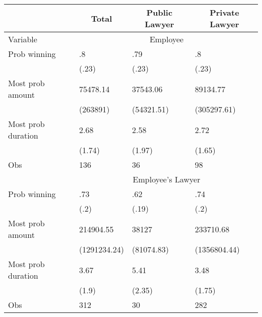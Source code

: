 \begin{tabular}{rrrr}
\toprule
      & \multicolumn{1}{c}{Total} & \multicolumn{1}{c}{Public Lawyer} & \multicolumn{1}{c}{Private Lawyer} \\
\midrule
\multicolumn{1}{l}{Variable} & \multicolumn{3}{c}{Employee} \\
\midrule
\midrule
\multicolumn{1}{l}{Prob winning} & \multicolumn{1}{l}{.8} & \multicolumn{1}{l}{.79} & \multicolumn{1}{l}{.8} \\
\multicolumn{1}{l}{} & \multicolumn{1}{l}{(.23)} & \multicolumn{1}{l}{(.23)} & \multicolumn{1}{l}{(.23)} \\
\multicolumn{1}{l}{Most prob amount} & \multicolumn{1}{l}{75478.14} & \multicolumn{1}{l}{37543.06} & \multicolumn{1}{l}{89134.77} \\
\multicolumn{1}{l}{} & \multicolumn{1}{l}{(263891)} & \multicolumn{1}{l}{(54321.51)} & \multicolumn{1}{l}{(305297.61)} \\
\multicolumn{1}{l}{Most prob duration} & \multicolumn{1}{l}{2.68} & \multicolumn{1}{l}{2.58} & \multicolumn{1}{l}{2.72} \\
\multicolumn{1}{l}{} & \multicolumn{1}{l}{(1.74)} & \multicolumn{1}{l}{(1.97)} & \multicolumn{1}{l}{(1.65)} \\
\multicolumn{1}{l}{Obs} & \multicolumn{1}{l}{136} & \multicolumn{1}{l}{36} & \multicolumn{1}{l}{98} \\
\midrule
\multicolumn{1}{l}{} & \multicolumn{3}{c}{Employee's Lawyer} \\
\midrule
\midrule
\multicolumn{1}{l}{Prob winning} & \multicolumn{1}{l}{.73} & \multicolumn{1}{l}{.62} & \multicolumn{1}{l}{.74} \\
\multicolumn{1}{l}{} & \multicolumn{1}{l}{(.2)} & \multicolumn{1}{l}{(.19)} & \multicolumn{1}{l}{(.2)} \\
\multicolumn{1}{l}{Most prob amount} & \multicolumn{1}{l}{214904.55} & \multicolumn{1}{l}{38127} & \multicolumn{1}{l}{233710.68} \\
\multicolumn{1}{l}{} & \multicolumn{1}{l}{(1291234.24)} & \multicolumn{1}{l}{(81074.83)} & \multicolumn{1}{l}{(1356804.44)} \\
\multicolumn{1}{l}{Most prob duration} & \multicolumn{1}{l}{3.67} & \multicolumn{1}{l}{5.41} & \multicolumn{1}{l}{3.48} \\
\multicolumn{1}{l}{} & \multicolumn{1}{l}{(1.9)} & \multicolumn{1}{l}{(2.35)} & \multicolumn{1}{l}{(1.75)} \\
\multicolumn{1}{l}{Obs} & \multicolumn{1}{l}{312} & \multicolumn{1}{l}{30} & \multicolumn{1}{l}{282} \\

\end{tabular}
